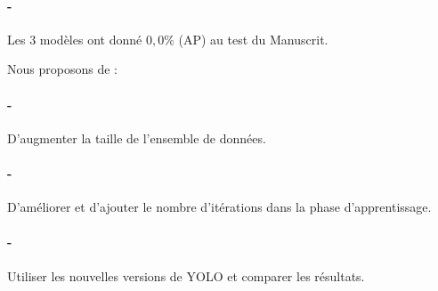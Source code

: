 \paragraph{-} Les 3 modèles ont donné $0,0\%$ (AP) au test du Manuscrit.

Nous proposons de : 
\paragraph{-} D’augmenter la taille de l'ensemble de données.
\paragraph{-} D’améliorer et d'ajouter le nombre d'itérations dans la phase d’apprentissage.
\paragraph{-} Utiliser les nouvelles versions de YOLO et comparer les résultats.

